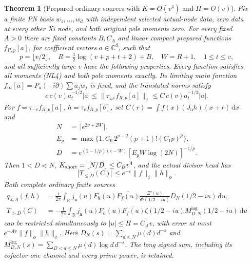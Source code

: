 \documentclass[11pt]{article}
\newtheorem{theorem}{Theorem}
\theoremstyle{remark}\newtheorem{remark}[theorem]{Remark}
\newcommand{\R}{\mathbb R}
\newcommand{\C}{\mathbb C}
\newcommand{\dd}{\,\mathrm d}
\begin{document}
\begin{theorem}[Prepared ordinary sources with \(K=O(v^4)\) and \(H=O(v)\)]
\label{thm:prepared-nearlinear-source}
Fix a finite PN basis \(w_1,\ldots,w_d\) with independent selected
actual-node data, zero data at every other Xi node, and both
original pole moments zero. For every fixed \(A>0\) there are
fixed constants \(B,C_A\) and linear compact prepared functions
\(f_{R,p}[a]\), for coefficient vectors \(a\in\C^d\), such that
\[
 p=\lfloor v/2\rfloor,\quad
 R=\tfrac12\log(v+p+t+2)+B,\quad W=R+1,\quad 1\le t\le v,        \tag{NL12}
\]
and all sufficiently large \(v\) have the following properties.
Every function satisfies all moments (NL4) and both pole
moments exactly. Its limiting main function
\(f_\infty[a]=P_{\mathrm n}(-i\partial)\sum a_jw_j\) is fixed,
and the translated norms satisfy
\[
 c\,c(v)a_t^{-1/2}|a|
 \le\|\tau_{\pm v}f_{R,p}[a]\|_\phi
 \le C\,c(v)a_t^{-1/2}|a|.                                   \tag{NL13}
\]
For \(f=\tau_{-v}f_{R,p}[a]\), \(h=\tau_vf_{R,p}[b]\), set
\(C(r)=\int\overline{f(x)}(J_{\mathrm n}h)(x+r)\dd x\) and
\[
 \begin{split}
 N&=\lceil e^{2v+2W}\rceil,\\
 E_p&=\max\{1,C_0\,2^{p-2}(p+1)!(C_1p)^p\},\\
 D&=e^{(2-1/p)(v-W)}
                  [E_pW\log(2N)]^{-1/p}.
 \end{split}                                                   \tag{NL14}
\]
Then \(1<D<N\), \(K_{\rm short}=\lfloor N/D\rfloor\le C_Bv^4\),
and the actual divisor head has
\[
 |T_{\le D}(C)|\le e^{-v}\|f\|_\phi\|h\|_\phi.                 \tag{NL15}
\]
Both complete ordinary finite sources
\[
 \begin{split}
 q_{J_{\mathrm n}A}(f,h)
  &=\frac{i}{2\pi}\int_\R j_{\mathrm n}(u)F_h(u)
          \overline{F_f(u)}
          \frac{\Xi'(u)}{\mathfrak G(1/2-iu)}
                         D_N(1/2-iu)\dd u,\\
 T_{>D}(C)
  &=-\frac1{2\pi}\int_\R j_{\mathrm n}(u)F_h(u)
        \overline{F_f(u)}
        \zeta(1/2-iu)M^{\log}_{D,N}(1/2-iu)\dd u
 \end{split}                                                   \tag{NL16}
\]
can be restricted simultaneously to \(|u|\le H=C_Av\), with
error at most \(e^{-Av}\|f\|_\phi\|h\|_\phi\).
Here \(D_N(s)=\sum_{d\le N}\mu(d)d^{-s}\) and
\(M^{\log}_{D,N}(s)=\sum_{D<d\le N}\mu(d)\log d\,d^{-s}\).
The long signed sum, including its cofactor-one channel and
every prime power, is retained.
\end{theorem}
\end{document}
